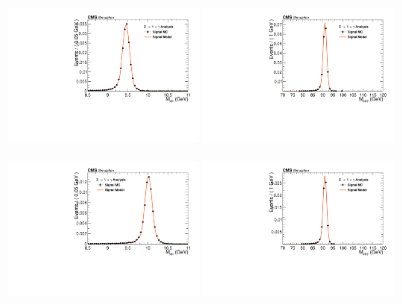 \begin{figure}[!htbp]
\begin{center}


\includegraphics[width=0.45\textwidth]{figures_and_tables/fitPlotFiles2D/ZToUpsilonPhotonSignalAndBackgroundFit/mMuMNU_ZToUpsilon1SPhotonSignalAndBackgroundFit_Signal_Cat1}\hspace*{1.cm}
\includegraphics[width=0.45\textwidth]{figures_and_tables/fitPlotFiles2D/ZToUpsilonPhotonSignalAndBackgroundFit/mHZ_ZToUpsilon1SPhotonSignalAndBackgroundFit_Signal_Cat1_default}\hspace*{1.cm}

\includegraphics[width=0.45\textwidth]{figures_and_tables/fitPlotFiles2D/ZToUpsilonPhotonSignalAndBackgroundFit/mMuMNU_ZToUpsilon2SPhotonSignalAndBackgroundFit_Signal_Cat1}\hspace*{1.cm}
\includegraphics[width=0.45\textwidth]{figures_and_tables/fitPlotFiles2D/ZToUpsilonPhotonSignalAndBackgroundFit/mHZ_ZToUpsilon2SPhotonSignalAndBackgroundFit_Signal_Cat1_default}\hspace*{1.cm}


\end{center}
\end{figure}
